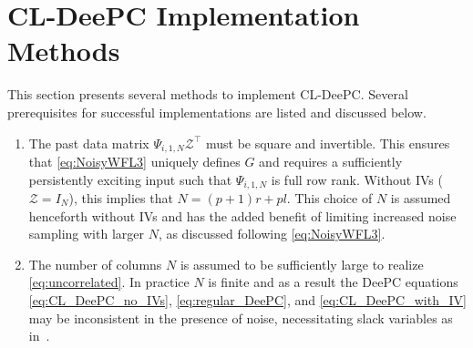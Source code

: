 \section{\acs{CL-DeePC} Implementation Methods}\label{sec:SolutionMethods}
This section presents several methods to implement \ac{CL-DeePC}. Several prerequisites for successful implementations are listed and discussed below.
\begin{enumerate}
    \item The past data matrix $\Psi_{i,1,N}\mathcal{Z}^\top$ must be square and invertible. This ensures that \eqref{eq:NoisyWFL3} uniquely defines $G$ and requires a sufficiently persistently exciting input such that $\Psi_{i,1,N}$ is full row rank. Without \ac{IVs} ($\mathcal{Z}=I_N$), this implies that $N=(p+1)r+pl$. This choice of $N$ is assumed henceforth without \ac{IVs} and has the added benefit of limiting increased noise sampling with larger $N$, as discussed following \eqref{eq:NoisyWFL3}.
    \item The number of columns $N$ is assumed to be sufficiently large to realize \eqref{eq:uncorrelated}. In practice $N$ is finite and as a result the \ac{DeePC} equations \eqref{eq:CL_DeePC_no_IVs}, \eqref{eq:regular_DeePC}, and \eqref{eq:CL_DeePC_with_IV} may be inconsistent in the presence of noise, necessitating slack variables as in~\cite{Coulson2019}.
\end{enumerate}
% 
%
